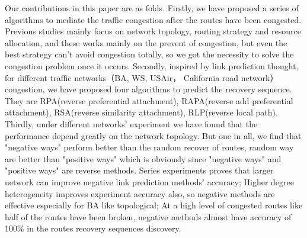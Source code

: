 \documentclass[onecolumn,preprintnumbers,amsmath,amssymb]{revtex4}
\begin{document}
Our contributions in this paper are as folds. 
Firstly, we have proposed a series of algorithms to mediate the traffic congestion after the routes have been congested. Previous studies mainly focus on network topology, routing strategy and resource allocation, and these works mainly on the prevent of congestion, but even the best strategy can't avoid congestion totally, so we got the necessity to solve the congestion problem once it occurs. 
Secondly, inspired by link prediction thought, for different traffic networks（BA, WS, USAir， California road network）congestion, we have proposed four algorithms to predict the recovery sequence. They are RPA(reverse preferential attachment), RAPA(reverse add preferential attachment), RSA(reverse similarity attachment), RLP(reverse local path).
Thirdly, under different networks' experiment we have found that the performance depend greatly on the network topology.
But one in all, we find that "negative ways" perform better than the random recover of routes, random way are better than "positive ways" which is obviously since "negative ways" and "positive ways" are reverse methods.
Series experiments proves that larger network can improve negative link prediction methods' accuracy; Higher degree heterogeneity improves experiment accuracy also, so negative methods are effective especially for BA like topological; At a high level of congested routes like half of the routes have been broken, negative methods almost have accuracy of 100\% in the routes recovery sequences discovery.







\end{document}
